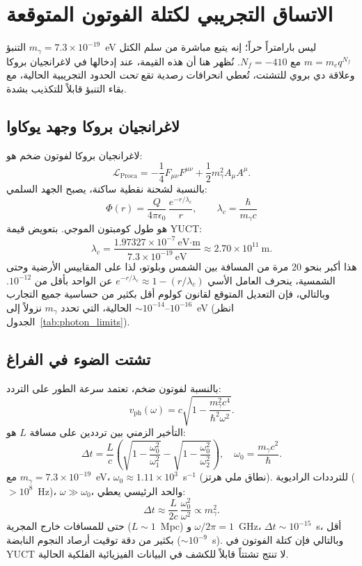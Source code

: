 \documentclass[12pt,a4paper]{article}
\begin{document}
	\clearpage
	\section{الاتساق التجريبي لكتلة الفوتون المتوقعة}
	\label{sec:photon_consistency}
	
	التنبؤ $m_\gamma = 7.3\times10^{-19}$~eV ليس بارامتراً حراً؛ إنه يتبع مباشرة من سلم الكتل $m = m_e q^{N_f}$ مع $N_f = -410$. نُظهر هنا أن هذه القيمة، عند إدخالها في لاغرانجيان بروكا وعلاقة دي بروي للتشتت، تُعطي انحرافات رصدية تقع \emph{تحت} الحدود التجريبية الحالية، مع بقاء التنبؤ قابلاً للتكذيب بشدة.
	
	\subsection{لاغرانجيان بروكا وجهد يوكاوا}
	
	لاغرانجيان بروكا لفوتون ضخم هو:
	\[
	\mathcal{L}_{\text{Proca}} = -\frac14 F_{\mu\nu}F^{\mu\nu} + \frac12 m_\gamma^2 A_\mu A^\mu .
	\]
	بالنسبة لشحنة نقطية ساكنة، يصبح الجهد السلمي:
	\[
	\Phi(r) = \frac{Q}{4\pi\epsilon_0}\,\frac{e^{-r/\lambda_c}}{r},
	\qquad
	\lambda_c = \frac{\hbar}{m_\gamma c}
	\]
	هو طول كومبتون الموجي. بتعويض قيمة YUCT:
	\[
	\lambda_c = \frac{1.97327\times10^{-7}~\text{eV·m}}{7.3\times10^{-19}~\text{eV}}
	\approx 2.70\times10^{11}~\text{m}.
	\]
	هذا أكبر بنحو 20 مرة من المسافة بين الشمس وبلوتو، لذا على المقاييس الأرضية وحتى الشمسية، ينحرف العامل الأسي $e^{-r/\lambda_c}\approx 1 - (r/\lambda_c)$ عن الواحد بأقل من $10^{-12}$. وبالتالي، فإن التعديل المتوقع لقانون كولوم أقل بكثير من حساسية جميع التجارب الحالية، التي تحدد $m_\gamma$ نزولاً إلى $\sim 10^{-14}$–$10^{-16}$~eV (انظر الجدول~\ref{tab:photon_limits}).
	
	\subsection{تشتت الضوء في الفراغ}
	
	بالنسبة لفوتون ضخم، تعتمد سرعة الطور على التردد:
	\[
	v_{\text{ph}}(\omega) = c\sqrt{1 - \frac{m_\gamma^2 c^4}{\hbar^2\omega^2}} .
	\]
	التأخير الزمني بين ترددين على مسافة $L$ هو:
	\[
	\Delta t = \frac{L}{c}\left( \sqrt{1-\frac{\omega_0^2}{\omega_1^2}} - \sqrt{1-\frac{\omega_0^2}{\omega_2^2}} \right),
	\quad \omega_0 = \frac{m_\gamma c^2}{\hbar}.
	\]
	مع $m_\gamma = 7.3\times10^{-19}$~eV، $\omega_0 \approx 1.11\times10^{3}$~s$^{-1}$ (نطاق ملي هرتز). للترددات الراديوية ($>10^8$~Hz)، $\omega \gg \omega_0$، والحد الرئيسي يعطي:
	\[
	\Delta t \approx \frac{L}{2c}\,\frac{\omega_0^2}{\omega^2} \propto m_\gamma^2.
	\]
	حتى للمسافات خارج المجرية ($L\sim 1$~Mpc) و $\omega/2\pi = 1$~GHz، $\Delta t \sim 10^{-15}$~s، أقل بكثير من دقة توقيت أرصاد النجوم النابضة ($\sim 10^{-9}$~s). وبالتالي فإن كتلة الفوتون في YUCT لا تنتج تشتتاً قابلاً للكشف في البيانات الفيزيائية الفلكية الحالية.
	
\end{document}
